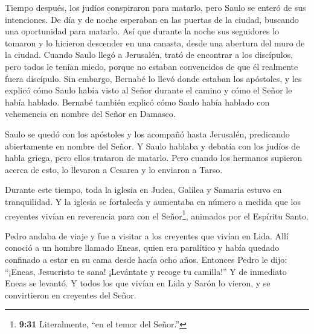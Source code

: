  Tiempo después, los judíos conspiraron para matarlo,
 pero Saulo se enteró de sus intenciones. De día y de noche
esperaban en las puertas de la ciudad, buscando una oportunidad para
matarlo.  Así que durante la noche sus seguidores lo
tomaron y lo hicieron descender en una canasta, desde una abertura del
muro de la ciudad.  Cuando Saulo llegó a Jerusalén, trató
de encontrar a los discípulos, pero todos le tenían miedo, porque no
estaban convencidos de que él realmente fuera discípulo. 
Sin embargo, Bernabé lo llevó donde estaban los apóstoles, y les explicó
cómo Saulo había visto al Señor durante el camino y cómo el Señor le
había hablado. Bernabé también explicó cómo Saulo había hablado con
vehemencia en nombre del Señor en Damasco.

 Saulo se quedó con los apóstoles y los acompañó hasta
Jerusalén,  predicando abiertamente en nombre del Señor. Y
Saulo hablaba y debatía con los judíos de habla griega, pero ellos
trataron de matarlo.  Pero cuando los hermanos supieron
acerca de esto, lo llevaron a Cesarea y lo enviaron a Tarso.

 Durante este tiempo, toda la iglesia en Judea, Galilea y
Samaria estuvo en tranquilidad. Y la iglesia se fortalecía y aumentaba
en número a medida que los creyentes vivían en reverencia para con el
Señor\footnote{\textbf{9:31} Literalmente, ``en el temor del Señor.''},
animados por el Espíritu Santo.

 Pedro andaba de viaje y fue a visitar a los creyentes que
vivían en Lida.  Allí conoció a un hombre llamado Eneas,
quien era paralítico y había quedado confinado a estar en su cama desde
hacía ocho años.  Entonces Pedro le dijo: ``¡Eneas,
Jesucristo te sana! ¡Levántate y recoge tu camilla!'' Y de inmediato
Eneas se levantó.  Y todos los que vivían en Lida y Sarón
lo vieron, y se convirtieron en creyentes del Señor.

